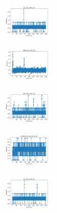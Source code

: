 \vspace*{\fill}
\newpage
\vspace*{\fill}

\begin{figure}[H]    
    \centering
    \begin{subfigure}
        \centering
        \includegraphics[width=0.234\textwidth]{img/aggsf/iris_set_const_20_949004259_time.png}
    \end{subfigure}
    \hfill
    \begin{subfigure}
        \centering
        \includegraphics[width=0.234\textwidth]{img/aggsf/ecoli_set_const_20_949004259_time.png}
    \end{subfigure}
    \hfill
    \begin{subfigure}
        \centering
        \includegraphics[width=0.234\textwidth]{img/aggsf/rand_set_const_20_949004259_time.png}
    \end{subfigure}
    \hfill
    \begin{subfigure}
        \centering
        \includegraphics[width=0.234\textwidth]{img/aggsf/newthyroid_set_const_20_949004259_time.png}
    \end{subfigure}
    \hfill
    \begin{subfigure}
        \centering
        \includegraphics[width=0.234\textwidth]{img/aggsf/iris_set_const_20_589741062_time.png}

\end{subfigure}
\end{figure}

